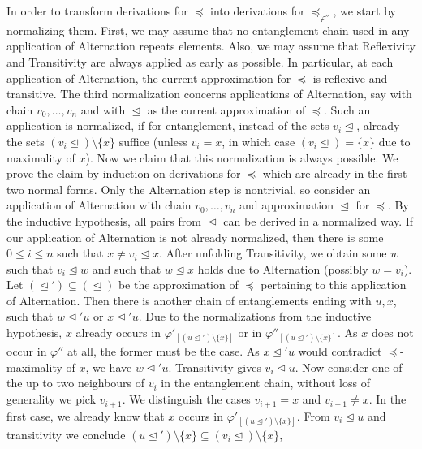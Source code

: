 \documentclass{LMCS}
\renewcommand{\phi}{\varphi}
\newcommand{\refl}{Reflexivity}
\newcommand{\trans}{Transitivity}
\newcommand{\alt}{Alternation}
\begin{document}
In order to transform derivations for $\preceq$ 
into derivations for $\preceq_{\phi''}$, 
we start by normalizing them. 
First, we may assume that no entanglement chain 
used in any application of \alt{} repeats elements. 
Also, we may assume that \refl{} and \trans{} 
are always applied as early as possible. 
In particular, at each application of \alt, 
the current approximation for $\preceq$ is reflexive and transitive. 
The third normalization concerns applications of \alt, 
say with chain $v_0,\ldots,v_n$ 
and with $\trianglelefteq$ as the current approximation of $\preceq$. 
Such an application is normalized, if for entanglement, 
instead of the sets $v_i\trianglelefteq$, 
already the sets $(v_i\trianglelefteq)\setminus\{x\}$ suffice 
(unless $v_i=x$, in which case $(v_i\trianglelefteq)=\{x\}$ 
due to maximality of $x$). 
Now we claim that this normalization is always possible. 
We prove the claim by induction on derivations for $\preceq$ 
which are already in the first two normal forms. 
Only the \alt{} step is nontrivial, 
so consider an application of \alt{} with chain $v_0,\ldots,v_n$ 
and approximation $\trianglelefteq$ for $\preceq$. 
By the inductive hypothesis, 
all pairs from $\trianglelefteq$ can be derived in a normalized way. 
If our application of \alt{} is not already normalized, 
then there is some $0\leq i\leq n$ such that $x\not=v_i\trianglelefteq x$. 
After unfolding \trans, 
we obtain some $w$ such that $v_i\trianglelefteq w$ 
and such that $w\trianglelefteq x$ holds due to \alt{} (possibly $w=v_i$). 
Let $(\trianglelefteq')\subseteq(\trianglelefteq)$ 
be the approximation of $\preceq$ pertaining to this application of \alt. 
Then there is another chain of entanglements 
ending with $u,x$, such that $w\trianglelefteq'u$ or $x\trianglelefteq'u$. 
Due to the normalizations from the inductive hypothesis, 
$x$ already occurs in $\phi'_{[(u\trianglelefteq')\setminus\{x\}]}$ 
or in $\phi''_{[(u\trianglelefteq')\setminus\{x\}]}$. 
As $x$ does not occur in $\phi''$ at all, the former must be the case. 
As $x\trianglelefteq'u$ would contradict $\preceq$-maximality of $x$, 
we have $w\trianglelefteq'u$. 
Transitivity gives $v_i\trianglelefteq u$. 
Now consider one of the up to two neighbours of $v_i$ 
in the entanglement chain, 
without loss of generality we pick $v_{i+1}$. 
We distinguish the cases $v_{i+1}=x$ and $v_{i+1}\not=x$. 
In the first case, 
we already know 
that $x$ occurs in $\phi'_{[(u\trianglelefteq')\setminus\{x\}]}$. 
{}From $v_i\trianglelefteq u$ and transitivity we conclude 
$(u\trianglelefteq')\setminus\{x\}\subseteq(v_i\trianglelefteq)\setminus\{x\}$, 
\end{document}
